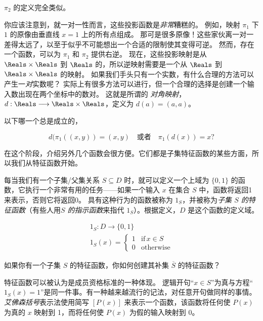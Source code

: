$\pi_2$ 的定义完全类似。

你应该注意到，就一对一性而言，这些投影函数是\emph{非常}糟糕的。
例如，映射 $\pi_1$ 下 $1$ 的原像由垂直线 $x=1$ 上的所有点组成。
那可是很多原像！这些家伙离一对一差得太远了，以至于似乎不可能想出一个合适的限制使其变得可逆。
然而，存在一个函数，可以为 $\pi_1$ 和 $\pi_2$ 提供右逆。
现在，这些投影映射是从 $\Reals \times \Reals$ 到 $\Reals$ 的，所以逆映射需要是一个从 $\Reals$ 到 $\Reals \times \Reals$ 的映射。
如果我们手头只有一个实数，有什么合理的方法可以产生一\emph{对}实数呢？
实际上有很多方法可以进行，但一个合理的选择是创建一个输入数出现在两个坐标中的数对。
这就是所谓的 \emph{对角映射}，$d:\Reals \longrightarrow \Reals \times \Reals$，定义为 $d(a) = (a,a)$。

\begin{exer}
以下哪一个总是成立的，

\[ d(\pi_1((x,y)) = (x,y) \quad \mbox{或者} \quad \pi_1(d(x)) = x? \] 
\end{exer}

在这个阶段，介绍另外几个函数会很方便。它们都是子集特征函数的某些方面，所以我们从特征函数开始。

每当我们有一个子集/父集关系 $S \subseteq D$ 时，就可以定义一个上域为 $\{0,1\}$ 的函数，它执行一个非常有用的任务——如果一个输入 $x$ 在集合 $S$ 中，函数将返回1来表示，否则它将返回0。
具有这种行为的函数被称为 $1_S$，并被称为\emph{子集 $S$ 的特征函数}（有些人用\emph{$S$ 的指示函数}来指代 $1_S$）。根据定义，$D$ 是这个函数的定义域。

\begin{gather*}
1_S: D \longrightarrow \{0,1\} \\
1_S(x) = \left\{ \begin{array}{cl} 1 & \mbox{if} \, x \in S \\ 0 & \mbox{otherwise} \end{array} \right.
\end{gather*}

\begin{exer}
如果你有一个子集 $S$ 的特征函数，你如何创建其补集 $\overline{S}$ 的特征函数？
\end{exer}

特征函数可以被认为是成员资格标准的一种体现。
逻辑开句“$x \in S$”为真与方程“$1_S(x) = 1$”是同一件事。有一种越来越流行的记法，对任意开句做同样的事情。
\emph{艾佛森括号}表示法使用简写 $[ P(x) ]$ 来表示一个函数，该函数将任何使 $P(x)$ 为真的 $x$ 映射到 1，而将任何使 $P(x)$ 为假的输入映射到 0。

